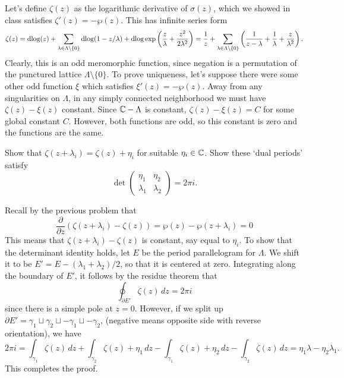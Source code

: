 \documentclass{pset}
\begin{document}
\begin{solution}
  Let's define $\zeta(z)$ as the logarithmic derivative of $\sigma(z)$, which we showed in class satisfies $\zeta'(z) = -\wp(z)$. This has infinite series form
  \[
    \zeta(z) = \mathrm{dlog}(z) + \sum_{\lambda\in \Lambda\setminus \{0\}} \mathrm{dlog}(1-z/\lambda) + \mathrm{dlog}\exp\left(\frac{z}{\lambda} + \frac{z^2}{2\lambda^2}\right) = \frac{1}{z} + \sum_{\lambda \in \Lambda\setminus \{0\}}\left(\frac{1}{z-\lambda}+\frac{1}{\lambda}+\frac{z}{\lambda^2}\right).
  \]
  Clearly, this is an odd meromorphic function, since negation is a permutation of the punctured lattice $\Lambda\setminus\{0\}$. To prove uniqueness, let's suppose there were some other odd function $\xi$ which satisfies $\xi'(z) = -\wp(z)$. Away from any singularities on $\Lambda$, in any simply connected neighborhood we must have $\zeta(z)-\xi(z)$ constant. Since $\mathbb{C}-\Lambda$ is constant, $\zeta(z)-\xi(z)=C$ for some global constant $C$. However, both functions are odd, so this constant is zero and the functions are the same.
\end{solution}

\begin{problem}{5.19}
  Show that $\zeta(z+\lambda_i) = \zeta(z)+\eta_i$ for suitable $\eta_i\in \mathbb{C}$. Show these `dual periods' satisfy
  \[
    \det\begin{pmatrix} \eta_1&\eta_2\\ \lambda_1&\lambda_2\end{pmatrix} = 2\pi i.
  \]
\end{problem}

\begin{solution}
  Recall by the previous problem that 
  \[
    \frac{\partial}{\partial z} (\zeta(z+\lambda_i) - \zeta(z)) = \wp(z) - \wp(z+\lambda_i) =0
  \]
  This means that $\zeta(z+\lambda_i)-\zeta(z)$ is constant, say equal to $\eta_i$. To show that the determinant identity holds, let $E$ be the period parallelogram for $\Lambda$. We shift it to be $E' = E - (\lambda_1+\lambda_2)/2$, so that it is centered at zero. Integrating along the boundary of $E'$, it follows by the residue theorem that 
  \[
    \oint_{\partial E'} \zeta(z)\,dz = 2\pi i
  \]
  since there is a simple pole at $z=0$. However, if we split up $\partial E' = \gamma_1 \sqcup \gamma_2 \sqcup -\gamma_1 \sqcup -\gamma_2$, (negative means opposite side with reverse orientation), we have
  \[
    2\pi i = \int_{\gamma_1}\zeta(z)\,dz+\int_{\gamma_2}\zeta(z)+\eta_1\,dz - \int_{\gamma_1} \zeta(z) + \eta_2\,dz - \int_{\gamma_2} \zeta(z)\,dz = \eta_1\lambda - \eta_2\lambda_1.
  \]
  This completes the proof.
\end{solution}
\end{document}
